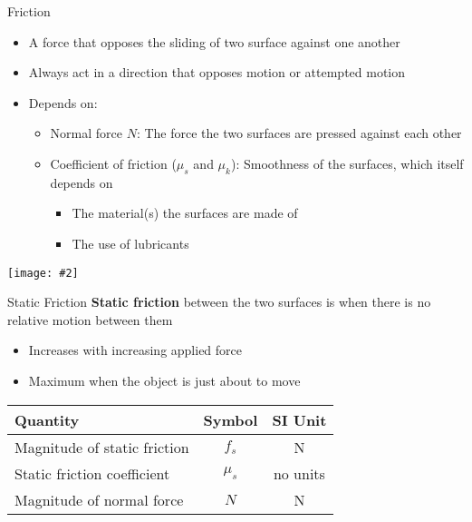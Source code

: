 \documentclass[12pt,compress,aspectratio=169]{beamer}
\newcommand{\pic}[2]{\texttt{[image: \#2]}}
\newcommand{\eq}[2]{\vspace{#1}{\Large\begin{displaymath}#2\end{displaymath}}}
\begin{document}
\begin{frame}{Friction}
  \begin{itemize}
  \item A force that opposes the sliding of two surface against one another
  \item Always act in a direction that opposes motion or attempted motion
  \item Depends on:
    \begin{itemize}
    \item Normal force $N$: The force the two surfaces are pressed against
      each other
    \item Coefficient of friction ($\mu_s$ and $\mu_k$): Smoothness of the
      surfaces, which itself depends on
      \begin{itemize}
      \item The material(s) the surfaces are made of
      \item The use of lubricants
      \end{itemize}
    \end{itemize}
  \end{itemize}
  \begin{center}
    \vspace{-.1in}
    \pic{.5}{graphics/friction}
  \end{center}
\end{frame}



\begin{frame}{Static Friction}
  \textbf{Static friction} between the two surfaces is when there is no
  relative motion between them
  \begin{itemize}
  \item Increases with increasing applied force
  \item Maximum when the object is just about to move
  \end{itemize}

  \eq{-.35in}{
    \boxed{f_s\leq\mu_sN}
  }
  \begin{center}
    \begin{tabular}{l|c|c}
      \rowcolor{pink}
      \textbf{Quantity} & \textbf{Symbol} & \textbf{SI Unit} \\ \hline
      Magnitude of static friction & $f_s$ & \si{\newton} \\
      Static friction coefficient  & $\mu_s$ & no units \\
      Magnitude of normal force    & $N$ & \si{\newton}
    \end{tabular}
  \end{center}
\end{frame}
\end{document}
